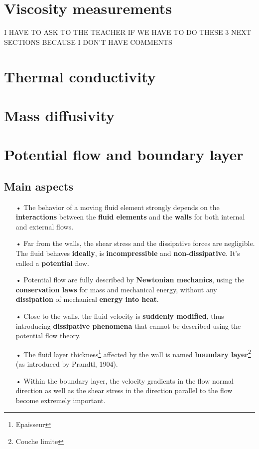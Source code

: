 \section{Viscosity measurements}
I HAVE TO ASK TO THE TEACHER IF WE HAVE TO DO THESE 3 NEXT SECTIONS BECAUSE I DON'T HAVE COMMENTS
	
\section{Thermal conductivity}
\section{Mass diffusivity}

\section{Potential flow and boundary layer}
\subsection{Main aspects}
\begin{itemize}
	\item[•] The behavior of a moving fluid element strongly depends on the \textbf{interactions} between the \textbf{fluid elements} and the \textbf{walls} for both internal and external flows. \\
	      	
	\item[•] Far from the walls, the shear stress and the dissipative forces are negligible. The fluid behaves \textbf{ideally}, is \textbf{incompressible} and \textbf{non-dissipative}. It's called a \textbf{potential} flow. \\
	      	
	\item[•] Potential flow are fully described by \textbf{Newtonian mechanics}, using the \textbf{conservation laws} for mass and mechanical energy, without any \textbf{dissipation} of mechanical \textbf{energy into heat}. \\
	      	
	\item[•] Close to the walls, the fluid velocity is \textbf{suddenly modified}, thus introducing \textbf{dissipative phenomena} that cannot be described using the potential flow theory.
	      	
	\item[•] The fluid layer thickness\footnote{Epaisseur} affected by the wall is named \textbf{boundary layer}\footnote{Couche limite} (as introduced by Prandtl, 1904).\\
	      	
	\item[•] Within the boundary layer, the velocity gradients in the flow normal direction as well as the shear stress in the direction parallel to the flow become extremely important.
\end{itemize}
	
